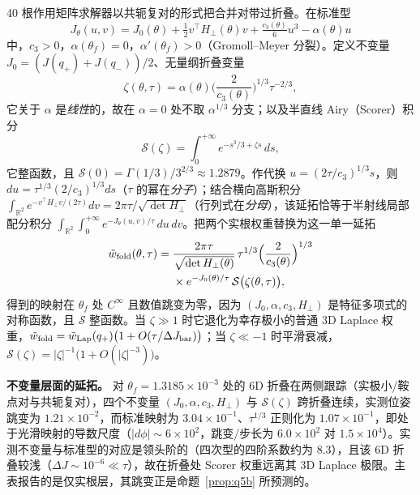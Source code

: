 \begin{proposition}\label{prop:q5c}
40 根作用矩阵求解器以共轭复对的形式把合并对带过折叠。在标准型
\begin{equation}
J_\theta(u,v)=J_0(\theta)+\tfrac12v^\top H_\perp(\theta)v+\tfrac{c_3(\theta)}{6}u^3-\alpha(\theta)u
\label{eq:normalform}
\end{equation}
中，$c_3>0$，$\alpha(\theta_f)=0$，$\alpha'(\theta_f)>0$（Gromoll--Meyer 分裂）。定义不变量 $J_0=(J(q_+)+J(q_-))/2$、无量纲折叠变量
\begin{equation}
\zeta(\theta,\tau)=\alpha(\theta)\Big(\frac{2}{c_3(\theta)}\Big)^{1/3}\tau^{-2/3},
\label{eq:zeta}
\end{equation}
它关于 $\alpha$ 是\emph{线性}的，故在 $\alpha=0$ 处不取 $\alpha^{1/3}$ 分支；以及半直线 Airy（Scorer）积分
\begin{equation}
\mathcal{S}(\zeta)=\int_0^{+\infty}e^{-s^3/3+\zeta s}\,ds,
\label{eq:scorer}
\end{equation}
它整函数，且 $\mathcal{S}(0)=\Gamma(1/3)/3^{2/3}\approx1.2879$。作代换 $u=(2\tau/c_3)^{1/3}s$，则 $du=\tau^{1/3}(2/c_3)^{1/3}ds$（$\tau$ 的幂在\emph{分子}）；结合横向高斯积分 $\int_{\mathbb{R}^2}e^{-v^\top H_\perp v/(2\tau)}dv=2\pi\tau/\sqrt{\det H_\perp}$（行列式在\emph{分母}），该延拓恰等于半射线局部配分积分 $\int_{\mathbb{R}^2}\int_0^{+\infty}e^{-J_\theta(u,v)/\tau}\,du\,dv$。把两个实根权重替换为这一单一延拓
\begin{equation}
\begin{split}
\tilde w_{\rm fold}(\theta,\tau)={}&\frac{2\pi\tau}{\sqrt{\det H_\perp(\theta)}}\,\tau^{1/3}\Big(\frac{2}{c_3(\theta)}\Big)^{1/3}\\
&\times e^{-J_0(\theta)/\tau}\,\mathcal{S}\big(\zeta(\theta,\tau)\big),
\end{split}
\label{eq:foldweight}
\end{equation}
得到的映射在 $\theta_f$ 处 $C^\infty$ 且数值跳变为零，因为 $(J_0,\alpha,c_3,H_\perp)$ 是特征多项式的对称函数，且 $\mathcal{S}$ 整函数。当 $\zeta\gg1$ 时它退化为幸存极小的普通 3D Laplace 权重，$\tilde w_{\rm fold}=\tilde w_{\rm Lap}(q_+)\big(1+O(\tau/\Delta J_{\rm bar})\big)$；当 $\zeta\ll-1$ 时平滑衰减，$\mathcal{S}(\zeta)=|\zeta|^{-1}\big(1+O(|\zeta|^{-3})\big)$。
\end{proposition}

\textbf{不变量层面的延拓。} 对 $\theta_f=1.3185\times10^{-3}$ 处的 6D 折叠在两侧跟踪（实极小/鞍点对与共轭复对），四个不变量 $(J_0,\alpha,c_3,H_\perp)$ 与 $\mathcal{S}(\zeta)$ 跨折叠连续，实测位姿跳变为 $1.21\times10^{-2}$，而标准映射为 $3.04\times10^{-1}$、$\tau^{1/3}$ 正则化为 $1.07\times10^{-1}$，即处于光滑映射的导数尺度（$|d\phi|\sim6\times10^2$，跳变/步长为 $6.0\times10^2$ 对 $1.5\times10^4$）。实测不变量与标准型的对应是领头阶的（四次型的四阶系数约为 $8.3$），且该 6D 折叠较浅（$\Delta J\sim10^{-6}\ll\tau$），故在折叠处 Scorer 权重远离其 3D Laplace 极限。主表报告的是仅实根层，其跳变正是命题~\ref{prop:q5b} 所预测的。

